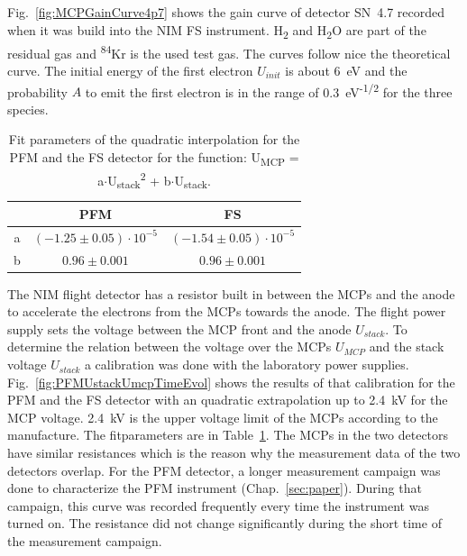 	Fig.~\ref{fig:MCPGainCurve4p7} shows the gain curve of detector SN~4.7 recorded when it was build into the NIM FS instrument. H\textsubscript{2} and H\textsubscript{2}O are part of the residual gas and \textsuperscript{84}Kr is the used test gas. The curves follow nice the theoretical curve. The initial energy of the first electron $U_{init}$ is about 6~eV and the probability $A$ to emit the first electron is in the range of 0.3~eV\textsuperscript{-1/2} for the three species.\\
	\begin{table}[h!] %
		\begin{center}
			\begin{tabular}{c|c|c|}
				& PFM	& FS\\ \hline
				a	& $(-1.25 \pm 0.05)\cdot10^{-5}$ & $(-1.54 \pm 0.05)\cdot10^{-5}$ \\
				b 	& $0.96 \pm 0.001$	& $0.96 \pm 0.001$\\
			\end{tabular}
		\end{center}
		\caption{Fit parameters of the quadratic interpolation for the PFM and the FS detector for the function: U\textsubscript{MCP} = a$\cdot$U\textsubscript{stack}\textsuperscript{2} + b$\cdot$U\textsubscript{stack}.}
		\label{tab:UstackUmcpFitParams}
	\end{table}
	The NIM flight detector has a resistor built in between the MCPs and the anode to accelerate the electrons from the MCPs towards the anode. The flight power supply sets the voltage between the MCP front and the anode $U_{stack}$. To determine the relation between the voltage over the MCPs $U_{MCP}$ and the stack voltage $U_{stack}$ a calibration was done with the laboratory power supplies. Fig.~\ref{fig:PFMUstackUmcpTimeEvol} shows the results of that calibration for the PFM and the FS detector with an quadratic extrapolation up to 2.4~kV for the MCP voltage. 2.4~kV is the upper voltage limit of the MCPs according to the manufacture. The fitparameters are in Table~\ref{tab:UstackUmcpFitParams}. The MCPs in the two detectors have similar resistances which is the reason why the measurement data of the two detectors overlap. For the PFM detector, a longer measurement campaign was done to characterize the PFM instrument (Chap.~\ref{sec:paper}). During that campaign, this curve was recorded frequently every time the instrument was turned on. The resistance did not change significantly during the short time of the measurement campaign.
	
